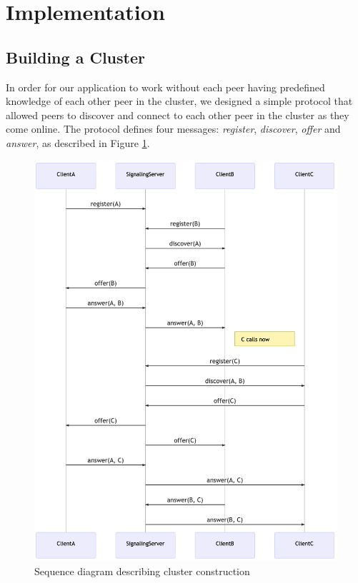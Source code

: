 \documentclass[11pt,twocolumn]{article}
\begin{document}
\section{Implementation}

\subsection{Building a Cluster}
In order for our application to work without each peer having predefined knowledge of each other peer in the cluster, we designed a simple protocol that allowed peers to discover and connect to each other peer in the cluster as they come online. The protocol defines four messages: \textit{register}, \textit{discover}, \textit{offer} and \textit{answer}, as described in Figure \ref{fig:cluster}.

\begin{figure}[h]
    \centering
    \includegraphics[scale=0.32]{cluster}
    \caption{Sequence diagram describing cluster construction}
    \label{fig:cluster}
\end{figure}
\end{document}
